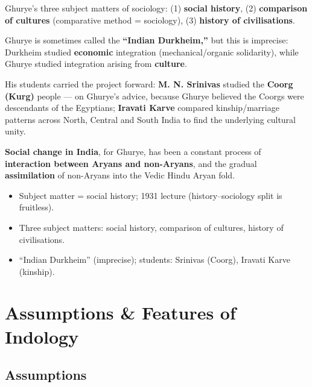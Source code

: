 \begin{KeyConcept}
Ghurye's three subject matters of sociology: (1) \textbf{social history}, (2) \textbf{comparison of cultures} (comparative method = sociology), (3) \textbf{history of civilisations}.
\end{KeyConcept}

\begin{CriticalPoint}
Ghurye is sometimes called the \textbf{``Indian Durkheim,'' } but this is imprecise: Durkheim studied \textbf{economic} integration (mechanical/organic solidarity), while Ghurye studied integration arising from \textbf{culture}.
\end{CriticalPoint}

His students carried the project forward: \textbf{M. N. Srinivas} studied the \textbf{Coorg (Kurg)} people --- on Ghurye's advice, because Ghurye believed the Coorgs were descendants of the Egyptians; \textbf{Iravati Karve} compared kinship/marriage patterns across North, Central and South India to find the underlying cultural unity.

\begin{KeyConcept}
\textbf{Social change in India}, for Ghurye, has been a constant process of \textbf{interaction between Aryans and non-Aryans}, and the gradual \textbf{assimilation} of non-Aryans into the Vedic Hindu Aryan fold.
\end{KeyConcept}

\begin{QuickRevision}
\begin{itemize}
\item Subject matter = social history; 1931 lecture (history--sociology split is fruitless).
\item Three subject matters: social history, comparison of cultures, history of civilisations.
\item ``Indian Durkheim'' (imprecise); students: Srinivas (Coorg), Iravati Karve (kinship).
\end{itemize}
\end{QuickRevision}

\section{Assumptions \& Features of Indology}

\subsection{Assumptions}

